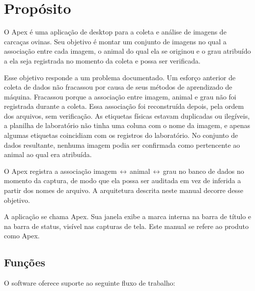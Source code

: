 \chapter{Propósito}


\vspace{4pt}
O Apex é uma aplicação de desktop para a coleta e análise de imagens de carcaças
ovinas. Seu objetivo é montar um conjunto de imagens no qual a associação entre
cada imagem, o animal do qual ela se originou e o grau atribuído a ela seja
registrada no momento da coleta e possa ser verificada.

Esse objetivo responde a um problema documentado. Um esforço anterior de coleta de
dados não fracassou por causa de seus métodos de aprendizado de máquina.
Fracassou porque a associação entre imagem, animal e grau não foi registrada
durante a coleta. Essa associação foi reconstruída depois, pela ordem dos
arquivos, sem verificação. As etiquetas físicas estavam duplicadas ou ilegíveis, a
planilha de laboratório não tinha uma coluna com o nome da imagem, e apenas
algumas etiquetas coincidiam com os registros do laboratório. No conjunto de dados
resultante, nenhuma imagem podia ser confirmada como pertencente ao animal ao qual
era atribuída.

\begin{note}[title={Objetivo de projeto}]
O Apex registra a associação
imagem\,$\leftrightarrow$\,animal\,$\leftrightarrow$\,grau no banco de dados no
momento da captura, de modo que ela possa ser auditada em vez de inferida a partir
dos nomes de arquivo. A arquitetura descrita neste manual decorre desse objetivo.
\end{note}

\begin{note}[title={Uma nota sobre o nome}]
A aplicação se chama Apex. Sua janela exibe a marca interna  na barra
de título e na barra de status, visível nas capturas de tela. Este manual se refere
ao produto como Apex.
\end{note}

\section{Funções}

O software oferece suporte ao seguinte fluxo de trabalho:

